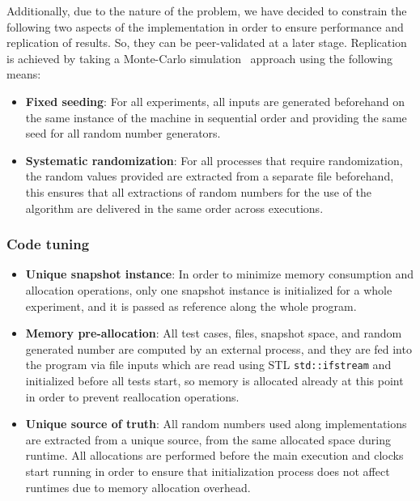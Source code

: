 Additionally, due to the nature of the problem, we have decided to constrain the following two aspects of the implementation in order to ensure performance and replication of results. So, they can be peer-validated at a later stage. Replication is achieved by taking a Monte-Carlo simulation~\cite{10.5555/1614191} approach using the following means:\\

\begin{itemize}
    \item{\textbf{Fixed seeding}:
    For all experiments, all inputs are generated beforehand on the same instance of the machine in sequential order and providing the same seed for all random number generators.}
    
    \item{\textbf{Systematic randomization}:
    For all processes that require randomization, the random values provided are extracted from a separate file beforehand, this ensures that all extractions of random numbers for the use of the algorithm are delivered in the same order across executions.}
\end{itemize}

\subsubsection{Code tuning}
\begin{itemize}
    \item{\textbf{Unique snapshot instance}: 
    In order to minimize memory consumption and allocation operations, only one snapshot instance is initialized for a whole experiment, and it is passed as reference along the whole program.}
    \item{\textbf{Memory pre-allocation}: 
    All test cases, files, snapshot space, and random generated number are computed by an external process, and they are fed into the program via file inputs which are read using STL \texttt{std::ifstream} and initialized before all tests start, so memory is allocated already at this point in order to prevent reallocation operations.}
    \item{\textbf{Unique source of truth}:
    All random numbers used along implementations are extracted from a unique source, from the same allocated space during runtime. All allocations are performed before the main execution and clocks start running in order to ensure that initialization process does not affect runtimes due to memory allocation overhead.}
\end{itemize}

